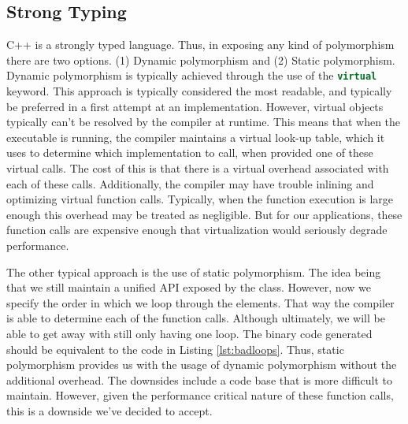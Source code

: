 \subsection{Strong Typing}
C++ is a strongly typed language. Thus, in exposing any kind of polymorphism there are two options. (1) Dynamic polymorphism and (2) Static polymorphism. Dynamic polymorphism is typically achieved through the use of the  \lstinline[language=c++]{virtual} keyword. This approach is typically considered the most readable, and typically be preferred in a first attempt at an implementation. However, virtual objects typically can't be resolved by the compiler at runtime. This means that when the executable is running, the compiler maintains a virtual look-up table, which it uses to determine which implementation to call, when provided one of these virtual calls. The cost of this is that there is a virtual overhead associated with each of these calls. Additionally, the compiler may have trouble inlining and optimizing virtual function calls. Typically, when the function execution is large enough this overhead may be treated as negligible. But for our applications, these function calls are expensive enough that virtualization would seriously degrade performance. 

The other typical approach is the use of static polymorphism. The idea being that we still maintain a unified API exposed by the class. However, now we specify the order in which we loop through the elements. That way the compiler is able to determine each of the function calls. Although ultimately, we will be able to get away with still only having one loop. The binary code generated should be equivalent to the code in Listing \ref{lst:badloops}. Thus, static polymorphism provides us with the usage of dynamic polymorphism without the additional overhead. The downsides include a code base that is more difficult to maintain. However, given the performance critical nature of these function calls, this is a downside we've decided to accept.

